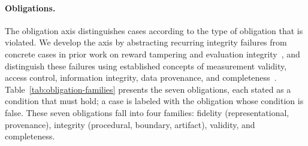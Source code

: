 \documentclass[letterpaper]{article} %
\begin{document}


\paragraph{Obligations.}
The obligation axis distinguishes cases according to the type of obligation that is violated. We develop the axis by abstracting recurring integrity failures from concrete cases in prior work on reward tampering and evaluation integrity~\citep{roger2023benchmarks,
denison2024sycophancy, atinafu2026rewardhackingagents, wang2026benchjack, deshpande2026benchmarking, thaman2026rewardhacking}, and distinguish these failures using established concepts of measurement validity, access control, information integrity, data provenance, and completeness~\citep{everitt2021reward, kane2013validating,
saltzer1975protection, clark1987comparison, buneman2001why, wang1996beyond}.
Table~\ref{tab:obligation-families} presents the seven obligations, each stated as a condition that must hold; a case is labeled with the obligation whose condition is false. These seven obligations fall into four families: fidelity (representational, provenance), integrity (procedural, boundary, artifact), validity, and completeness.


\end{document}
